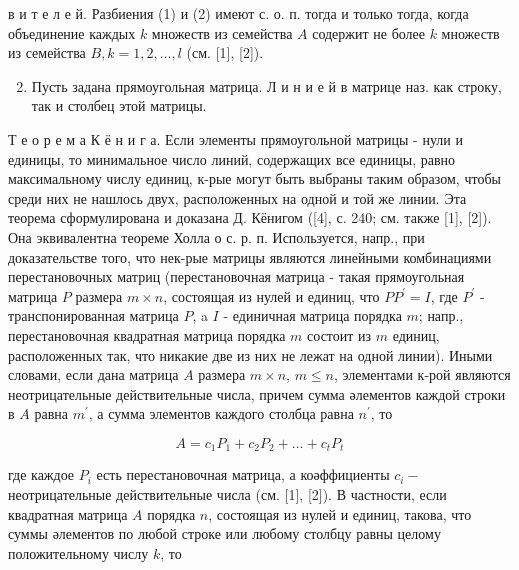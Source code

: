 \documentclass[10pt]{article}
\begin{document}
в и т е л е й. Разбиения (1) и (2) имеют с. о. п. тогда и только тогда, когда объединение каждых $k$ множеств из семейства $A$ содержит не более $k$ множеств из семейства $B, k=1,2, \ldots, l$ (см. [1], [2]).



\begin{enumerate}

  \setcounter{enumi}{1}

  \item Пусть задана прямоугольная матрица. Л и н и е й в матрице наз. как строку, так и столбец этой матрицы.

\end{enumerate}



Т е о р е м а $К$ ё н и г а. Если элементы прямоугольной матрицы - нули и единицы, то минимальное число линий, содержащих все единицы, равно максимальному числу единиц, к-рые могут быть выбраны таким образом, чтобы среди них не нашлось двух, расположенных на одной и той же линии. Эта теорема сформулирована и доказана Д. Кёнигом ([4], с. 240; см. также [1], [2]). Она эквивалентна теореме Холла о с. р. п. Используется, напр., при доказательстве того, что нек-рые матрицы являются линейными комбинациями перестановочных матриц (перестановочная матрица - такая прямоугольная матрица $P$ размера $m \times n$, состоящая из нулей и единиц, что $P P^{\prime}=I$, где $P^{\prime}$ - транспонированная матрица $P$, a $I$ - единичная матрица порядка $m$; напр., перестановочная квадратная матрица порядка $m$ состоит из $m$ единиц, расположенных так, что никакие две из них не лежат на одной линии). Иными словами, если дана матрица $A$ размера $m \times n$, $m \leqslant n$, элементами к-рой являются неотрицательные действительные числа, причем сумма әлементов каждой строки в $A$ равна $m^{\prime}$, а сумма элементов каждого столбца равна $n^{\prime}$, то



\[

A=c_{1} P_{1}+c_{2} P_{2}+\ldots+c_{t} P_{t}

\]



где каждое $P_{i}$ есть перестановочная матрица, а коәффициенты $c_{i}-$ неотрицательные действительные числа (см. [1], [2]). В частности, если квадратная матрица $A$ порядка $n$, состоящая из нулей и единиц, такова, что суммы әлементов по любой строке или любому столбцу равны целому положительному числу $k$, то
\end{document}
